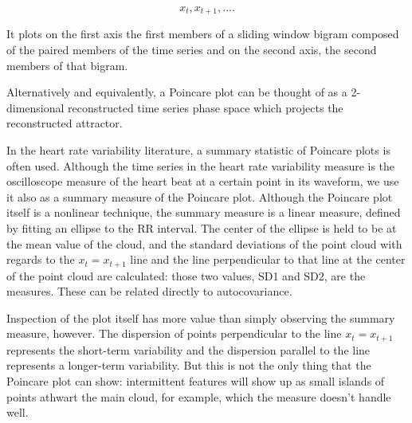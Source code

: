 \documentclass[12pt]{article}
\begin{document}
$$x_t, x_{t+1}, .... $$

It plots on the first axis the first members of a sliding window bigram composed of the paired members of the time series and on the second axis, the second members of that bigram.

Alternatively and equivalently, a Poincare plot can be thought of as a 2-dimensional reconstructed time series phase space which projects the reconstructed attractor\cite{kamen}.

In the heart rate variability literature, a summary statistic of Poincare plots is often used. Although the time series in the heart rate variability measure is the oscilloscope measure of the heart beat at a certain point in its waveform, we use it also as a summary measure of the Poincare plot. Although the Poincare plot itself is a nonlinear technique, the summary measure is a linear measure\cite{kamen}, defined by fitting an ellipse to the RR interval. The center of the ellipse is held to be at the mean value of the cloud, and the standard deviations of the point cloud with regards to the $x_t = x_{t+1}$ line and the line perpendicular to that line at the center of the point cloud are calculated: those two values, SD1 and SD2, are the measures. These can be related directly to autocovariance\cite{kamen}.

Inspection of the plot itself has more value than simply observing the summary measure, however. The dispersion of points perpendicular to the line $x_t = x_{t+1}$ represents the short-term variability and the dispersion parallel to the line represents a longer-term variability. But this is not the only thing that the Poincare plot can show: intermittent features will show up as small islands of points athwart the main cloud, for example, which the measure doesn't handle well.
\end{document}
